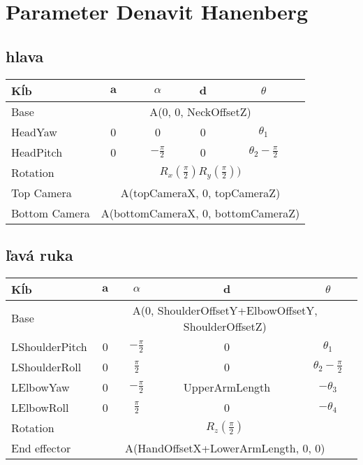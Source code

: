 \section{Parameter Denavit Hanenberg} \label{appedix_dh}

\subsection{hlava}
\begin{center}
	\begin{tabular}{|l|c|c|c|c|}
	\hline
	\textbf{Kĺb} & $\textbf{a}$ & $\mathbb{\alpha}$ & $\textbf{d}$ & $\theta$ \\
	\hline
	Base & \multicolumn{4}{|c|}{A(0, 0, NeckOffsetZ)} \\
	\hline
	HeadYaw & 0 & 0 & 0 & $\theta_1$ \\
	\hline
	HeadPitch & 0 & $-\frac{\pi}{2}$ & 0 & $\theta_2 - \frac{\pi}{2}$ \\
	\hline
	Rotation & \multicolumn{4}{|c|}{$R_x\left(\frac{\pi}{2}\right)R_y\left(\frac{\pi}{2}\right))$} \\
	\hline
	Top Camera & \multicolumn{4}{|c|}{A(topCameraX, 0, topCameraZ)} \\
	\hline
	Bottom Camera & \multicolumn{4}{|c|}{A(bottomCameraX, 0, bottomCameraZ)} \\
	\hline
	\end{tabular}
\end{center}

\subsection{ľavá ruka}
\begin{center}
	\begin{tabular}{|l|c|c|c|c|}
	\hline
	\textbf{Kĺb} & $\textbf{a}$ & $\mathbb{\alpha}$ & $\textbf{d}$ & $\theta$ \\
	\hline
	Base & \multicolumn{4}{|c|}{A(0, ShoulderOffsetY+ElbowOffsetY, ShoulderOffsetZ)} \\
	\hline
	LShoulderPitch & 0 & $-\frac{\pi}{2}$ & 0 & $\theta_1$ \\
	\hline
	LShoulderRoll & 0 & $\frac{\pi}{2}$ & 0 & $\theta_2 - \frac{\pi}{2}$ \\
	\hline
	LElbowYaw & 0 & $-\frac{\pi}{2}$ & UpperArmLength & $-\theta_3$ \\
	\hline
	LElbowRoll & 0 & $\frac{\pi}{2}$ & 0 & $-\theta_4$ \\
	\hline
	Rotation & \multicolumn{4}{|c|}{$R_z\left(\frac{\pi}{2}\right)$} \\
	\hline
	End effector & \multicolumn{4}{|c|}{A(HandOffsetX+LowerArmLength, 0, 0)} \\
	\hline
	\end{tabular}
\end{center}

